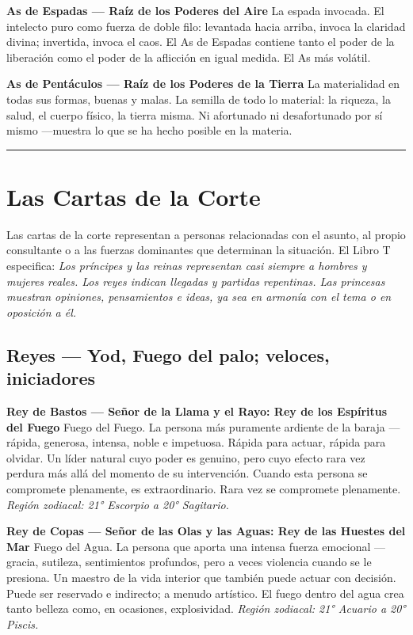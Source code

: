 \textbf{As de Espadas --- Raíz de los Poderes del Aire} La espada invocada. El intelecto puro como fuerza de doble filo: levantada hacia arriba, invoca la claridad divina; invertida, invoca el caos. El As de Espadas contiene tanto el poder de la liberación como el poder de la aflicción en igual medida. El As más volátil.

\textbf{As de Pentáculos --- Raíz de los Poderes de la Tierra} La materialidad en todas sus formas, buenas y malas. La semilla de todo lo material: la riqueza, la salud, el cuerpo físico, la tierra misma. Ni afortunado ni desafortunado por sí mismo ---muestra lo que se ha hecho posible en la materia.

\begin{center}\rule{0.5\linewidth}{0.5pt}\end{center}

\section{Las Cartas de la Corte}\label{the-court-cards}

Las cartas de la corte representan a personas relacionadas con el asunto, al propio consultante o a las fuerzas dominantes que determinan la situación. El Libro T especifica: \emph{Los príncipes y las reinas representan casi siempre a hombres y mujeres reales. Los reyes indican llegadas y partidas repentinas. Las princesas muestran opiniones, pensamientos e ideas, ya sea en armonía con el tema o en oposición a él.}

\subsection{Reyes --- Yod, Fuego del palo; veloces, iniciadores}\label{kings--yod-fire-of-the-suit-swift-initiating}

\textbf{Rey de Bastos --- Señor de la Llama y el Rayo: Rey de los Espíritus del Fuego} Fuego del Fuego. La persona más puramente ardiente de la baraja ---rápida, generosa, intensa, noble e impetuosa. Rápida para actuar, rápida para olvidar. Un líder natural cuyo poder es genuino, pero cuyo efecto rara vez perdura más allá del momento de su intervención. Cuando esta persona se compromete plenamente, es extraordinario. Rara vez se compromete plenamente. \emph{Región zodiacal: 21° Escorpio a 20° Sagitario.}

\textbf{Rey de Copas --- Señor de las Olas y las Aguas: Rey de las Huestes del Mar} Fuego del Agua. La persona que aporta una intensa fuerza emocional ---gracia, sutileza, sentimientos profundos, pero a veces violencia cuando se le presiona. Un maestro de la vida interior que también puede actuar con decisión. Puede ser reservado e indirecto; a menudo artístico. El fuego dentro del agua crea tanto belleza como, en ocasiones, explosividad. \emph{Región zodiacal: 21° Acuario a 20° Piscis.}

